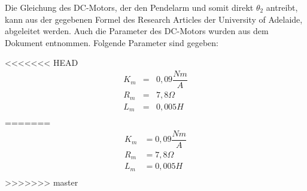Die Gleichung des DC-Motors, der den Pendelarm und somit direkt $\theta_2$ antreibt, kann aus der gegebenen Formel des Research Articles der University of Adelaide, abgeleitet werden.\cite{Cazzolato.2011}
Auch die Parameter des DC-Motors wurden aus dem Dokument entnommen. Folgende Parameter sind gegeben:

<<<<<<< HEAD
\begin{eqnarray}
K_m &=& 0,09  \dfrac{Nm}{A} \\
R_m &=& 7,8  \Omega \\
L_m &=& 0,005  H \\
\end{eqnarray}
=======
\begin{align}
K_m &= 0,09  \dfrac{Nm}{A} \\
R_m &= 7,8  \Omega \\
L_m &= 0,005  H \\
\end{align}
>>>>>>> master
